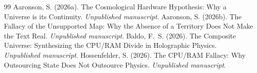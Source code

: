 \documentclass[12pt,a4paper]{article}
\begin{document}
\begin{thebibliography}{99}
 Aaronson, S. (2026a). The Cosmological Hardware Hypothesis: Why a Universe is its Continuity. \emph{Unpublished manuscript}.
 Aaronson, S. (2026b). The Fallacy of the Unsupported Map: Why the Absence of a Territory Does Not Make the Text Real. \emph{Unpublished manuscript}.
 Baldo, F.~S. (2026). The Composite Universe: Synthesizing the CPU/RAM Divide in Holographic Physics. \emph{Unpublished manuscript}.
 Hossenfelder, S. (2026). The CPU/RAM Fallacy: Why Outsourcing State Does Not Outsource Physics. \emph{Unpublished manuscript}.
\end{thebibliography}
\end{document}
